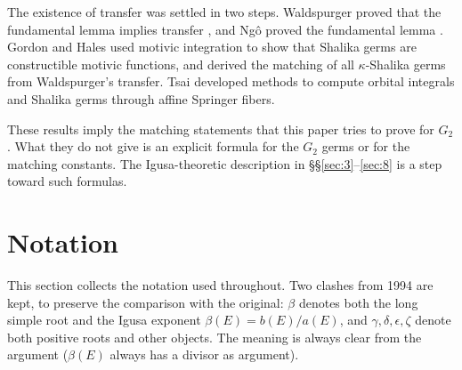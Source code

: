 \documentclass[12pt,letterpaper]{amsart}
\theoremstyle{plain}
\theoremstyle{definition}
\theoremstyle{remark}
\theoremstyle{definition}
\begin{document}
The existence of transfer was settled in two steps. Waldspurger proved that
the fundamental lemma implies transfer \cite{Wa97}, and Ng\^o proved the
fundamental lemma \cite{Ng10}. Gordon and Hales \cite{GH16} used motivic
integration to show that Shalika germs are constructible motivic functions,
and derived the matching of all $\kappa$-Shalika germs from Waldspurger's
transfer. Tsai \cite{Ts15} developed methods to compute orbital integrals and
Shalika germs through affine Springer fibers.

These results imply the matching statements that this paper tries to prove
for $G_2$. What they do not give is an explicit formula for the $G_2$ germs or
for the matching constants. The Igusa-theoretic description in
\S\S\ref{sec:3}--\ref{sec:8} is a step toward such formulas.

\section*{Notation}
This section collects the notation used throughout. Two clashes from 1994 are
kept, to preserve the comparison with the original: $\beta$ denotes both the
long simple root and the Igusa exponent $\beta(E)=b(E)/a(E)$, and
$\gamma,\delta,\epsilon,\zeta$ denote both positive roots and other objects.
The meaning is always clear from the argument ($\beta(E)$ always has a divisor
as argument).
\end{document}
